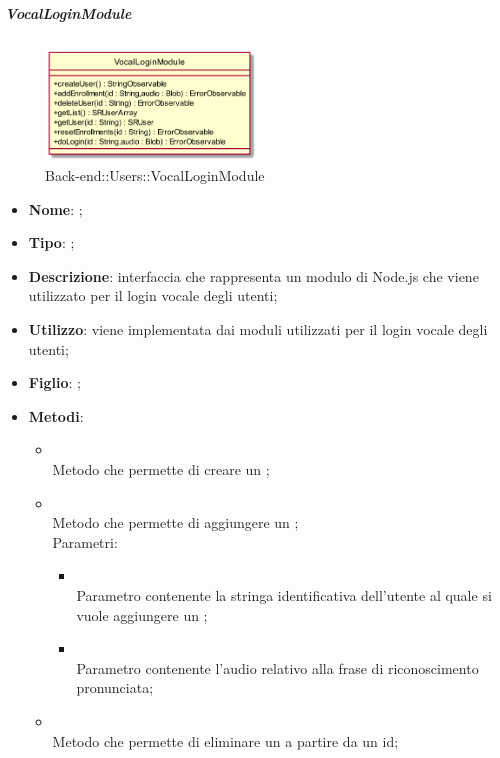 \hypertarget{VocalLoginModule_label}{\subparagraph{VocalLoginModule}}
\begin{figure}[h]
	\centering
	\includegraphics[width=0.50\textwidth,height=\textheight,keepaspectratio]{images/ClassVocalLoginModule.png}
	\caption{Back-end::Users::VocalLoginModule}
\end{figure}
\begin{itemize}
	\item \textbf{Nome}: ;
	\item \textbf{Tipo}: ;
	\item \textbf{Descrizione}: interfaccia che rappresenta un modulo di Node.js che viene utilizzato per il login vocale degli utenti;
	\item \textbf{Utilizzo}: viene implementata dai moduli utilizzati per il login vocale degli utenti;
	\item \textbf{Figlio}: ;
	\item \textbf{Metodi}:
	\begin{itemize}
		\item[]  \\		Metodo che permette di creare un ;\\
		\item[]  \\		Metodo che permette di aggiungere un ;\\
		Parametri:
		\begin{itemize}
			\item {} \\
			Parametro contenente la stringa identificativa dell'utente al quale si vuole aggiungere un ;
			\item {} \\
			Parametro contenente l'audio relativo alla frase di riconoscimento pronunciata;
		\end{itemize}
		\item[]  \\		Metodo che permette di eliminare un  a partire da un id;\\

\end{itemize}
\end{itemize}
